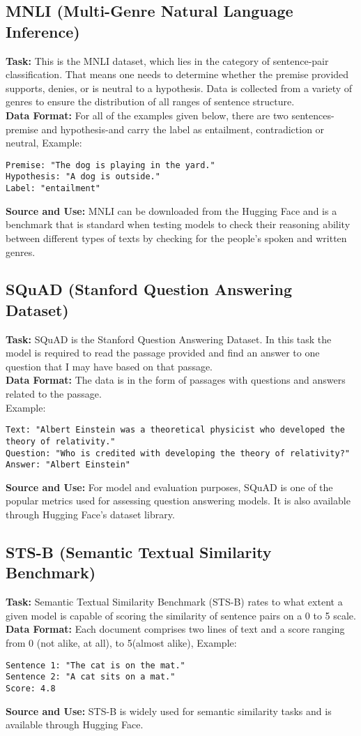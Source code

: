 ﻿\documentclass{article}
\begin{document}
\subsection{MNLI (Multi-Genre Natural Language Inference)}
\textbf{Task:} This is the MNLI dataset, which lies in the category of sentence-pair classification. That means one needs to determine whether the premise provided supports, denies, or is neutral to a hypothesis. Data is collected from a variety of genres to ensure the distribution of all ranges of sentence structure.\\
\textbf{Data Format:} For all of the examples given below, there are two sentences-premise and hypothesis-and carry the label as entailment, contradiction or neutral, Example:
\begin{verbatim}
Premise: "The dog is playing in the yard."
Hypothesis: "A dog is outside."
Label: "entailment"
\end{verbatim}
\textbf{Source and Use:} MNLI can be downloaded from the Hugging Face and is a benchmark that is standard when testing models to check their reasoning ability between different types of texts by checking for the people's spoken and written genres.

\subsection{SQuAD (Stanford Question Answering Dataset)}
\textbf{Task:} SQuAD is the Stanford Question Answering Dataset. In this task the model is required to read the passage provided and find an answer to one question that I may have based on that passage.\\
\textbf{Data Format:} The data is in the form of passages with questions and answers related to the passage.\\
Example:

\begin{verbatim}
Text: "Albert Einstein was a theoretical physicist who developed the theory of relativity."
Question: "Who is credited with developing the theory of relativity?"
Answer: "Albert Einstein"
\end{verbatim}
\textbf{Source and Use:} For model and evaluation purposes, SQuAD is one of the popular metrics used for assessing question answering models. It is also available through Hugging Face's dataset library.

\subsection{STS-B (Semantic Textual Similarity Benchmark)}
\textbf{Task:} Semantic Textual Similarity Benchmark (STS-B) rates to what extent a given model is capable of scoring the similarity of sentence pairs on a 0 to 5 scale.\\
\textbf{Data Format:} Each document comprises two lines of text and a score ranging from 0 (not alike, at all), to 5(almost alike), Example:
\begin{verbatim}
Sentence 1: "The cat is on the mat."
Sentence 2: "A cat sits on a mat."
Score: 4.8
\end{verbatim}
\textbf{Source and Use:} STS-B is widely used for semantic similarity tasks and is available through Hugging Face.
\end{document}
